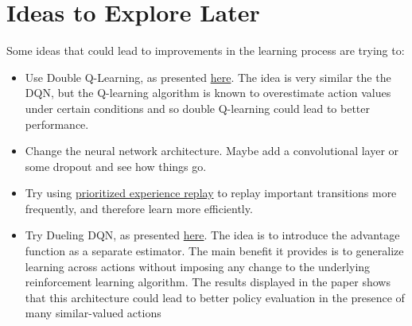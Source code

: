 \documentclass[
]{article}
\begin{document}
\pagebreak

\hypertarget{ideas-to-explore-later}{%
\section{Ideas to Explore Later}\label{ideas-to-explore-later}}

Some ideas that could lead to improvements in the learning process are
trying to:

\begin{itemize}
\item
  Use Double Q-Learning, as presented
  \href{https://arxiv.org/pdf/1509.06461}{here}. The idea is very
  similar the the DQN, but the Q-learning algorithm is known to
  overestimate action values under certain conditions and so double
  Q-learning could lead to better performance.
\item
  Change the neural network architecture. Maybe add a convolutional
  layer or some dropout and see how things go.
\item
  Try using \href{https://arxiv.org/pdf/1511.05952}{prioritized
  experience replay} to replay important transitions more frequently,
  and therefore learn more efficiently.
\item
  Try Dueling DQN, as presented
  \href{https://arxiv.org/pdf/1511.06581}{here}. The idea is to
  introduce the advantage function as a separate estimator. The main
  benefit it provides is to generalize learning across actions without
  imposing any change to the underlying reinforcement learning
  algorithm. The results displayed in the paper shows that this
  architecture could lead to better policy evaluation in the presence of
  many similar-valued actions
\end{itemize}
\end{document}
